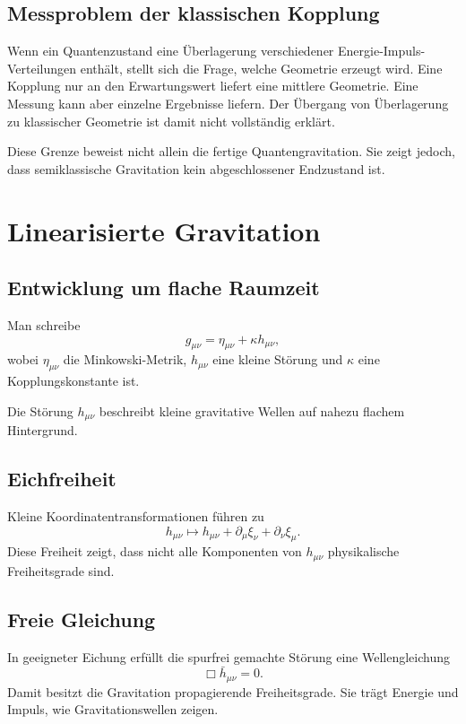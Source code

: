 \documentclass[11pt,a4paper,openany]{book}
\theoremstyle{remark}
\newcommand{\Boxop}{\Box}
\begin{document}
\section{Messproblem der klassischen Kopplung}
Wenn ein Quantenzustand eine Überlagerung verschiedener Energie-Impuls-Verteilungen enthält, stellt sich die Frage, welche Geometrie erzeugt wird. Eine Kopplung nur an den Erwartungswert liefert eine mittlere Geometrie. Eine Messung kann aber einzelne Ergebnisse liefern. Der Übergang von Überlagerung zu klassischer Geometrie ist damit nicht vollständig erklärt.

Diese Grenze beweist nicht allein die fertige Quantengravitation. Sie zeigt jedoch, dass semiklassische Gravitation kein abgeschlossener Endzustand ist.

\chapter{Linearisierte Gravitation}
\section{Entwicklung um flache Raumzeit}
Man schreibe
\begin{equation}
g_{\mu\nu}=\eta_{\mu\nu}+\kappa h_{\mu\nu},
\end{equation}
wobei $\eta_{\mu\nu}$ die Minkowski-Metrik, $h_{\mu\nu}$ eine kleine Störung und $\kappa$ eine Kopplungskonstante ist.

Die Störung $h_{\mu\nu}$ beschreibt kleine gravitative Wellen auf nahezu flachem Hintergrund.

\section{Eichfreiheit}
Kleine Koordinatentransformationen führen zu
\begin{equation}
h_{\mu\nu}\mapsto h_{\mu\nu}+\partial_\mu \xi_\nu+\partial_\nu \xi_\mu.
\end{equation}
Diese Freiheit zeigt, dass nicht alle Komponenten von $h_{\mu\nu}$ physikalische Freiheitsgrade sind.

\section{Freie Gleichung}
In geeigneter Eichung erfüllt die spurfrei gemachte Störung eine Wellengleichung
\begin{equation}
\Boxop \bar h_{\mu\nu}=0.
\end{equation}
Damit besitzt die Gravitation propagierende Freiheitsgrade. Sie trägt Energie und Impuls, wie Gravitationswellen zeigen.
\end{document}
